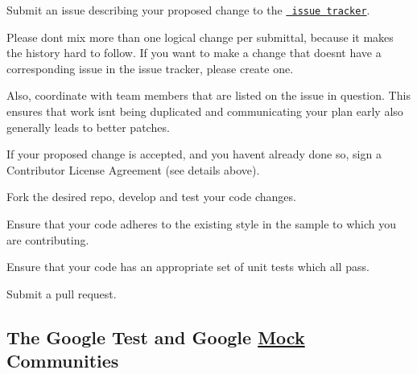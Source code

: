 \begin{DoxyEnumerate}
\item Submit an issue describing your proposed change to the \href{https://github.com/google/googletest}{\texttt{ issue tracker}}.
\end{DoxyEnumerate}
\begin{DoxyEnumerate}
\item Please don\textquotesingle{}t mix more than one logical change per submittal, because it makes the history hard to follow. If you want to make a change that doesn\textquotesingle{}t have a corresponding issue in the issue tracker, please create one.
\end{DoxyEnumerate}
\begin{DoxyEnumerate}
\item Also, coordinate with team members that are listed on the issue in question. This ensures that work isn\textquotesingle{}t being duplicated and communicating your plan early also generally leads to better patches.
\end{DoxyEnumerate}
\begin{DoxyEnumerate}
\item If your proposed change is accepted, and you haven\textquotesingle{}t already done so, sign a Contributor License Agreement (see details above).
\end{DoxyEnumerate}
\begin{DoxyEnumerate}
\item Fork the desired repo, develop and test your code changes.
\end{DoxyEnumerate}
\begin{DoxyEnumerate}
\item Ensure that your code adheres to the existing style in the sample to which you are contributing.
\end{DoxyEnumerate}
\begin{DoxyEnumerate}
\item Ensure that your code has an appropriate set of unit tests which all pass.
\end{DoxyEnumerate}
\begin{DoxyEnumerate}
\item Submit a pull request.
\end{DoxyEnumerate}

\subsection*{The Google Test and Google \mbox{\hyperlink{classMock}{Mock}} Communities}

